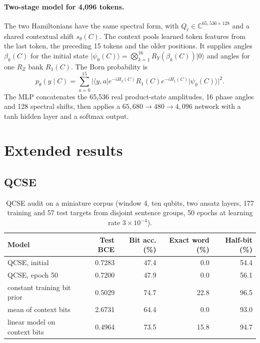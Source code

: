 \documentclass[11pt,a4paper]{article}
\providecommand{\ket}[1]{\lvert #1\rangle}
\providecommand{\bra}[1]{\langle #1\rvert}
\begin{document}
  \paragraph{Two-stage model for 4,096 tokens.}
  The two Hamiltonians have the same spectral form, with $Q_\ell\in\mathbb C^{65{,}536\times128}$ and a shared contextual shift $s_\theta(C)$. The context pools learned token features from the last token, the preceding 15 tokens and the older positions. It supplies angles $\beta_k(C)$ for the initial state $\ket{\psi_0(C)}=\bigotimes_{k=1}^{16}R_Y(\beta_k(C))\ket{0}$ and angles for one $R_Z$ bank $R_1(C)$. The Born probability is
  \begin{equation}
    p_\theta(y\mid C)=\sum_{a=0}^{15}\bigl|\bra{y,a}e^{-iH_2(C)}R_1(C)e^{-iH_1(C)}\ket{\psi_0(C)}\bigr|^2 .
  \end{equation}
  The MLP concatenates the 65,536 real product-state amplitudes, 16 phase angles and 128 spectral shifts, then applies a $65{,}680\to480\to4{,}096$ network with a tanh hidden layer and a softmax output.


  \section{Extended results}
  \label{app:results}

  \subsection{QCSE}

  \begin{table}[H]
    \centering\small
    \caption{QCSE audit on a miniature corpus (window 4, ten qubits, two ansatz layers, 177 training and 57 test targets from disjoint sentence groups, 50 epochs at learning rate $3\times10^{-4}$).}
    \label{tab:audit}
    \begin{tabular}{@{}lrrrr@{}}
      \toprule
      Model                        & Test BCE & Bit acc. (\%) & Exact word (\%) & Half-bit (\%) \\
      \midrule
      QCSE, initial                & 0.7283   & 47.4          & 0.0             & 54.4          \\
      QCSE, epoch 50               & 0.7200   & 47.9          & 0.0             & 56.1          \\
      constant training bit prior  & 0.5029   & 74.7          & 22.8            & 96.5          \\
      mean of context bits         & 2.6731   & 64.4          & 0.0             & 93.0          \\
      linear model on context bits & 0.4964   & 73.5          & 15.8            & 94.7          \\
      \bottomrule
    \end{tabular}
  \end{table}
\end{document}

